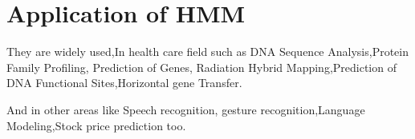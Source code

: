 \documentclass{article}
\begin{document}
\section{Application of HMM}
\item
They are widely used,In health care field such as DNA Sequence Analysis,Protein Family Profiling, Prediction of Genes, Radiation Hybrid Mapping,Prediction of DNA Functional Sites,Horizontal gene Transfer.
\item
And in other areas like Speech recognition, gesture recognition,Language Modeling,Stock price  prediction too. 
\end{document}
